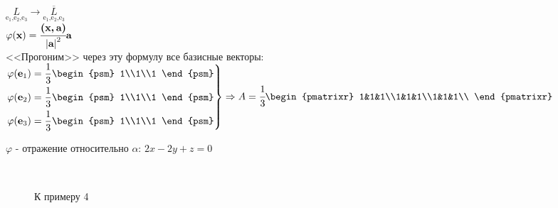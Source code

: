 \noindent$\underset{\text{e$_1$,e$_2$,e$_3$}}{L}\rightarrow\underset{\text{e$_1$,e$_2$,e$_3$}}{\overline{L}}$\\
$\varphi(\textbf{x})=\cfrac{\textbf{(x,\,a)}}{\left|\textbf{a}\right|^2}\textbf{a}$\\
<<Прогоним>> через эту формулу все базисные векторы:\\
$\left.
\begin{aligned}
\phi(\textbf{e$_1$})=\frac{1}{3}\begin{psm}
1\\1\\1
\end{psm}\\
\phi(\textbf{e$_2$})=\frac{1}{3}\begin{psm}
1\\1\\1
\end{psm}\\
\phi(\textbf{e$_3$})=\frac{1}{3}\begin{psm}
1\\1\\1
\end{psm}
\end{aligned}
\right\}\Rightarrow A = \cfrac{1}{3}\begin{pmatrixr}
1&1&1\\1&1&1\\1&1&1\\
\end{pmatrixr}
$
\\
\begin{prim}
	$\varphi$ - отражение относительно $\alpha$: $2x-2y+z=0$
\end{prim}\\

\begin{wrapfigure}{r}{0.35\linewidth}
	\vspace{-4cm}
	\def\svgwidth{6cm} %
	
	\caption{К примеру 4}
	\label{...}
	\vspace{-9cm}
\end{wrapfigure}

